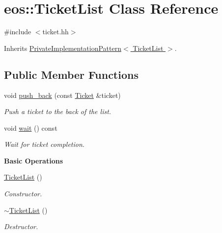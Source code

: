 \hypertarget{classeos_1_1TicketList}{
\section{eos::TicketList Class Reference}
\label{classeos_1_1TicketList}
}


{\ttfamily \#include $<$ticket.hh$>$}

Inherits \hyperlink{classeos_1_1PrivateImplementationPattern}{PrivateImplementationPattern$<$ TicketList $>$}.\subsection*{Public Member Functions}
\begin{DoxyCompactItemize}
\item 
void \hyperlink{classeos_1_1TicketList_a150d362cc9ab4ffdb821edec64b76abe}{push\_\-back} (const \hyperlink{classeos_1_1Ticket}{Ticket} \&ticket)
\begin{DoxyCompactList}\small\item\em Push a ticket to the back of the list. \item\end{DoxyCompactList}\item 
void \hyperlink{classeos_1_1TicketList_ac152da1ea00be93a0c59150f132c6ad3}{wait} () const 
\begin{DoxyCompactList}\small\item\em Wait for ticket completion. \item\end{DoxyCompactList}\end{DoxyCompactItemize}
\begin{Indent}{\bf Basic Operations}\par
{\em \label{_amgrpb5794bba6843c21acafdd6a4bfd776be}
 }\begin{DoxyCompactItemize}
\item 
\hyperlink{classeos_1_1TicketList_a7d61cc782f984a4ec8665d3cdfc5489a}{TicketList} ()
\begin{DoxyCompactList}\small\item\em Constructor. \item\end{DoxyCompactList}\item 
\hyperlink{classeos_1_1TicketList_a948cabad909856a5d32cd3f90156b4d1}{$\sim$TicketList} ()
\begin{DoxyCompactList}\small\item\em Destructor. \item\end{DoxyCompactList}\end{DoxyCompactItemize}
\end{Indent}


